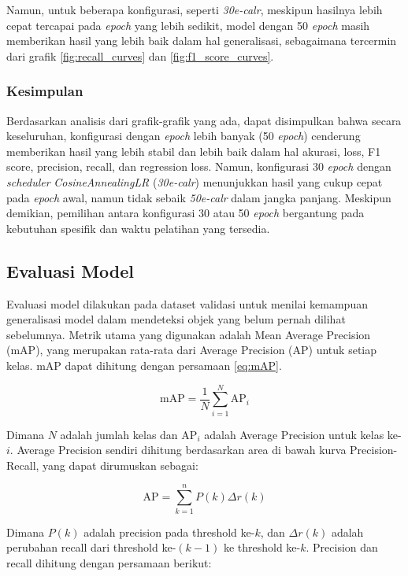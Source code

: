 Namun, untuk beberapa konfigurasi, seperti \emph{30e-calr}, meskipun hasilnya lebih cepat tercapai pada \emph{epoch} yang lebih sedikit, model dengan 50 \emph{epoch} masih memberikan hasil yang lebih baik dalam hal generalisasi, sebagaimana tercermin dari grafik \ref{fig:recall_curves} dan \ref{fig:f1_score_curves}.

\subsubsection{Kesimpulan}

Berdasarkan analisis dari grafik-grafik yang ada, dapat disimpulkan bahwa secara keseluruhan, konfigurasi dengan \emph{epoch} lebih banyak (50 \emph{epoch}) cenderung memberikan hasil yang lebih stabil dan lebih baik dalam hal akurasi, loss, F1 score, precision, recall, dan regression loss. Namun, konfigurasi 30 \emph{epoch} dengan \emph{scheduler} \emph{CosineAnnealingLR} (\emph{30e-calr}) menunjukkan hasil yang cukup cepat pada \emph{epoch} awal, namun tidak sebaik \emph{50e-calr} dalam jangka panjang. Meskipun demikian, pemilihan antara konfigurasi 30 atau 50 \emph{epoch} bergantung pada kebutuhan spesifik dan waktu pelatihan yang tersedia.

\subsection{Evaluasi Model}

Evaluasi model dilakukan pada dataset validasi untuk menilai kemampuan generalisasi model dalam mendeteksi objek yang belum pernah dilihat sebelumnya. Metrik utama yang digunakan adalah Mean Average Precision (mAP), yang merupakan rata-rata dari Average Precision (AP) untuk setiap kelas. mAP dapat dihitung dengan persamaan \ref{eq:mAP}.

\begin{equation}
\mbox{mAP} = \frac{1}{N} \sum_{i=1}^{N} \mbox{AP}_i
\label{eq:mAP}
\end{equation}

Dimana $N$ adalah jumlah kelas dan $\mbox{AP}_i$ adalah Average Precision untuk kelas ke-$i$. Average Precision sendiri dihitung berdasarkan area di bawah kurva Precision-Recall, yang dapat dirumuskan sebagai:

\begin{equation}
\mbox{AP} = \sum_{k=1}^{n} P(k) \Delta r(k)
\label{eq:AP}
\end{equation}

Dimana $P(k)$ adalah precision pada threshold ke-$k$, dan $\Delta r(k)$ adalah perubahan recall dari threshold ke-$(k-1)$ ke threshold ke-$k$. Precision dan recall dihitung dengan persamaan berikut:

